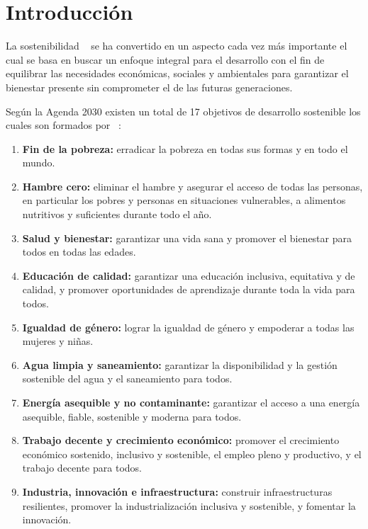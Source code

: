 
\section{Introducción}
La sostenibilidad ~\cite{wiki:Sostenibilidad} se ha convertido en un aspecto cada vez más importante el cual se basa en  buscar un enfoque integral para el desarrollo con el fin de equilibrar las necesidades económicas, sociales y ambientales para garantizar el bienestar presente sin comprometer el de las futuras generaciones.

Según la Agenda 2030 existen un total de 17 objetivos de desarrollo sostenible los cuales son formados por ~\cite{ODS}:
\begin{enumerate}
    \item \textbf{Fin de la pobreza:} erradicar la pobreza en todas sus formas y en todo el mundo.
    \item \textbf{Hambre cero:} eliminar el hambre y asegurar el acceso de todas las personas, en particular los pobres y personas en situaciones vulnerables, a alimentos nutritivos y suficientes durante todo el año.
    \item \textbf{Salud y bienestar:} garantizar una vida sana y promover el bienestar para todos en todas las edades.
    \item \textbf{Educación de calidad:} garantizar una educación inclusiva, equitativa y de calidad, y promover oportunidades de aprendizaje durante toda la vida para todos.
    \item \textbf{Igualdad de género:} lograr la igualdad de género y empoderar a todas las mujeres y niñas.
    \item \textbf{Agua limpia y saneamiento:} garantizar la disponibilidad y la gestión sostenible del agua y el saneamiento para todos.
    \item \textbf{Energía asequible y no contaminante:} garantizar el acceso a una energía asequible, fiable, sostenible y moderna para todos.
    \item \textbf{Trabajo decente y crecimiento económico:} promover el crecimiento económico sostenido, inclusivo y sostenible, el empleo pleno y productivo, y el trabajo decente para todos.
    \item \textbf{Industria, innovación e infraestructura:} construir infraestructuras resilientes, promover la industrialización inclusiva y sostenible, y fomentar la innovación.

\end{enumerate}

